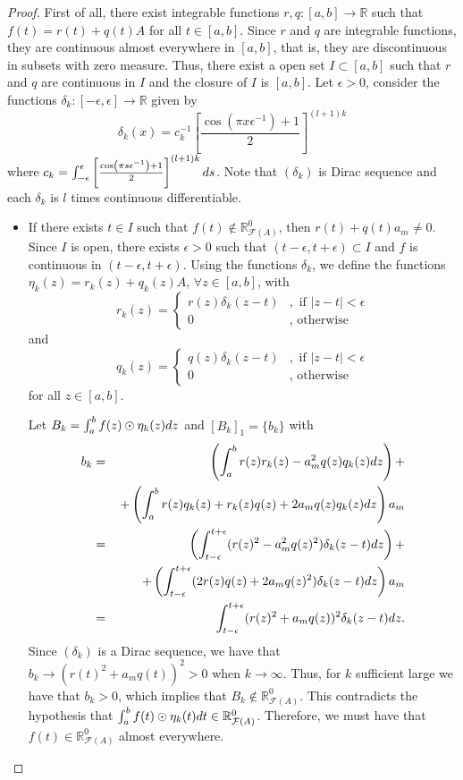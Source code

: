 \documentclass[10pt,a4paper]{amsart}
\newcommand{\RFA}{\mathbb{R}_{\mathcal{F}(A)}}
\newcommand{\RR}{\mathbb{R}}
\begin{document}
\begin{proof}
First of all, there exist integrable functions $r,q:[a,b]\to \RR$ such that $f(t) = r(t) + q(t)A$ for all $t \in [a,b]$. Since $r$ and $q$ are integrable functions, they are continuous almost everywhere in $[a,b]$, that is, they are discontinuous in subsets with zero measure. Thus, there exist a open set $I \subset [a,b]$ such that $r$ and $q$ are continuous in $I$ and  the closure of $I$ is $[a,b]$. 
Let $\epsilon> 0$, consider the functions $\delta_k:[-\epsilon,\epsilon]\to \RR$ given by 
$$
\delta_k(x) = c_k^{-1}\left[\frac{\cos\left(\pi x\epsilon^{-1}\right)+1}{2}\right]^{(l+1)k}
$$
where $c_k = \int_{-\epsilon}^\epsilon \left[\frac{\cos\left(\pi s\epsilon^{-1}\right)+1}{2}\right]^{(l+1)k} \textnormal{d}s$. Note that $(\delta_k)$ is Dirac sequence and each $\delta_k$ is $l$ times continuous differentiable.


\begin{itemize}
\item[(i)] If there exists $t \in I$ such that $f(t) \not\in \RFA^0$, then $r(t) + q(t)a_m \neq 0$.  
Since $I$ is open, there exists $\epsilon > 0$ such that $(t-\epsilon, t+\epsilon) \subset I$ and $f$ is continuous in $(t-\epsilon, t+\epsilon)$. 
Using the functions $\delta_k$, we define the functions $\eta_k(z) = r_k(z) + q_k(z)A$, $\forall z \in [a,b]$, with 
$$
r_k(z) = \left\lbrace\begin{array}{cl}
r(z)\delta_k(z-t)    &, \mbox{ if } |z-t|< \epsilon \\
0     &, \mbox{ otherwise}  
\end{array}\right.
$$
and 
$$
q_k(z) = \left\lbrace\begin{array}{cl}
q(z)\delta_k(z-t)    &, \mbox{ if } |z-t|< \epsilon \\
0     &, \mbox{ otherwise}  
\end{array}\right.
$$
for all $z \in [a,b].$

Let $B_k = \int_{a}^{b} f(z)\odot\eta_k(z)\textnormal{d}z$ and $[B_k]_1 = \{b_k\}$ with
\begin{eqnarray*}
b_k & = & \left(\int_{a}^{b} r(z)r_k(z) - a_m^2q(z)q_k(z) \textnormal{d}z\right) +  \\ &  & \, +   
\left(\int_{a}^{b} r(z)q_k(z) + r_k(z)q(z) + 2a_mq(z)q_k(z) \textnormal{d}z\right)a_m \\
& = & \left(\int_{t-\epsilon}^{t+\epsilon} (r(z)^2 - a_m^2q(z)^2)\delta_k(z-t) \textnormal{d}z\right) +   \\ &  & \, +    
\left(\int_{t-\epsilon}^{t+\epsilon} (2r(z)q(z) + 2a_mq(z)^2)\delta_k(z-t) \textnormal{d}z\right)a_m \\
& = & \int_{t-\epsilon}^{t+\epsilon} (r(z)^2 + a_mq(z))^2\delta_k(z-t) \textnormal{d}z.
\end{eqnarray*}
Since $(\delta_k)$ is a Dirac sequence, we have that $b_k \to (r(t)^2 + a_mq(t))^2 > 0$ when $k \to \infty$. Thus, for $k$ sufficient large we have that $b_k > 0$, which implies that $B_k \not\in \RFA^0$. This contradicts the hypothesis that $\int_{a}^{b} f(t)\odot\eta_k(t)\textnormal{d}t \in \RFA^0$. 
Therefore, we must have that $f(t) \in \RFA^0$ almost everywhere. 


\end{itemize}
\end{proof}
\end{document}
